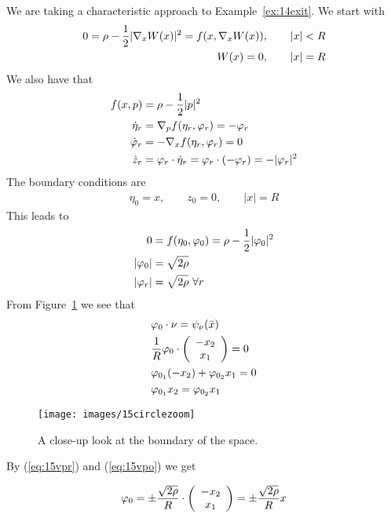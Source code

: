 \begin{example}
We are taking a characteristic approach to Example~\ref{ex:14exit}.
We start with
\begin{align*}
0 = \rho - \frac{1}{2}|\nabla_xW(x)|^2 = f(x,\nabla_xW(x))&, \qquad |x|<R \\
W(x) = 0&, \qquad |x| = R
\end{align*}
We also have that
\begin{align*}
f(x,p) &= \rho-\frac{1}{2}|p|^2 \\
\dot{\eta}_r &= \nabla_p f(\eta_r,\varphi_r) = -\varphi_r \\
\dot{\varphi}_r &= -\nabla_x f(\eta_r,\varphi_r) = 0 \\
\dot{z}_r &= \varphi_r\cdot\dot{\eta}_r = \varphi_r\cdot(-\varphi_r) = -|\varphi_r|^2
\end{align*}
The boundary conditions are
\begin{align*}
\eta_0 = x, \qquad z_0=0, \qquad |x|=R
\end{align*}
This leads to
\begin{align}
\label{eq:15vpr}
0 &= f(\eta_0,\varphi_0) = \rho-\frac{1}{2}|\varphi_0|^2 \nonumber \\
|\varphi_0| &= \sqrt{2\rho} \nonumber \\
|\varphi_r| &= \sqrt{2\rho}~\forall r
\end{align}
From Figure~\ref{fig:15circlezoom} we see that
\begin{align}
\label{eq:15vpo}
&\varphi_0\cdot\nu = \psi_\nu(\bar{x}) \nonumber \\
&\frac{1}{R}\varphi_0\cdot\left(\begin{array}{c} -x_2 \\ x_1 \end{array}\right) = 0 \nonumber\\
&\varphi_{0_1} (-x_2) + \varphi_{0_2}x_1 = 0 \nonumber\\
&\varphi_{0_1}x_2 = \varphi_{0_2}x_1
\end{align}

\begin{figure}[ht!]
\centering
\texttt{[image: images/15circlezoom]}
\caption{A close-up look at the boundary of the space.}%
\label{fig:15circlezoom}
\end{figure}

By (\ref{eq:15vpr}) and (\ref{eq:15vpo}) we get

\begin{equation*}
\varphi_0 = \pm\frac{\sqrt{2\rho}}{R}\cdot\left(\begin{array}{c} -x_2 \\ x_1 \end{array}\right) = \pm\frac{\sqrt{2\rho}}{R}x
\end{equation*}


\end{example}
